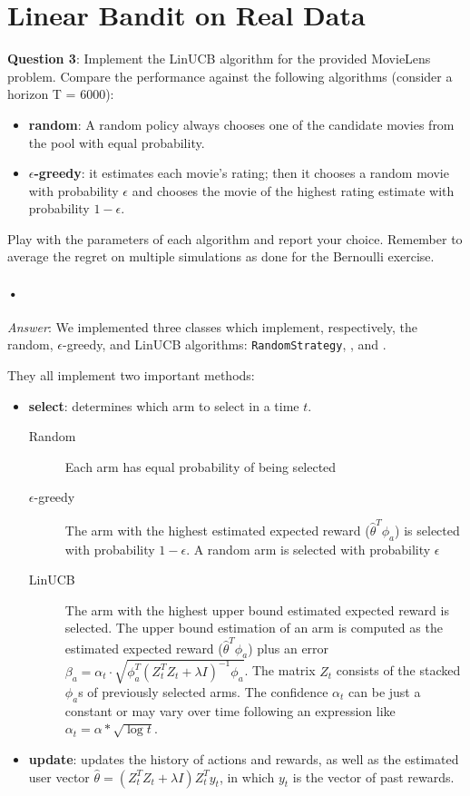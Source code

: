 \documentclass[a4paper]{article}
\begin{document}
\section{Linear Bandit on Real Data}
\label{sec:second_exercise}

\textbf{Question 3}: Implement the LinUCB algorithm for the provided MovieLens problem. Compare the performance against the following algorithms (consider a horizon T = 6000):
\begin{itemize}
    \item \textbf{random}: A random policy always chooses one of the candidate movies from the pool with equal probability.
    \item \textbf{$\epsilon$-greedy}: it estimates each movie’s rating; then it chooses a random movie with probability $\epsilon$ and chooses the movie of the highest rating estimate with probability $1 - \epsilon$.
\end{itemize}
Play with the parameters of each algorithm and report your choice. Remember to average the regret on multiple simulations as done for the Bernoulli exercise.

\paragraph{•}
\textit{Answer}: We implemented three classes which implement, respectively, the random, $\epsilon$-greedy, and LinUCB algorithms: \texttt{RandomStrategy}, , and .

They all implement two important methods:

\begin{itemize}
    \item \textbf{select}: determines which arm to select in a time $t$.
    \begin{description}
        \item[Random] Each arm has equal probability of being selected
        \item[$\epsilon$-greedy] The arm with the highest estimated expected reward ($\hat{\theta}^T \phi_a$) is selected with probability $1 - \epsilon$. A random arm is selected with probability $\epsilon$
        \item[LinUCB] The arm with the highest upper bound estimated expected reward is selected. The upper bound estimation of an arm is computed as the estimated expected reward ($\hat{\theta}^T \phi_a$) plus an error $\beta_a = \alpha_t \cdot \sqrt{\phi_a^T(Z_t^T Z_t + \lambda I)^{-1}\phi_a}$. The matrix $Z_t$ consists of the stacked $\phi_a$s of previously selected arms. The confidence $\alpha_t$ can be just a constant or may vary over time following an expression like $\alpha_t = \alpha * \sqrt{\log t}$.
    \end{description}
    \item \textbf{update}: updates the history of actions and rewards, as well as the estimated user vector $\hat{\theta} = (Z_t^T Z_t + \lambda I)Z_t^T y_t$, in which $y_t$ is the vector of past rewards.
\end{itemize}
\end{document}
